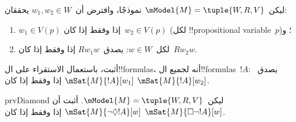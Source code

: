 \documentclass[../../../include/open-logic-section]{subfiles}
\begin{document}
\begin{prob}
  ليكن~$\mModel{M} = \tuple{W, R, V}$ نموذجًا، وافترض أن~$w_1, w_2 \in
  W$ يحققان:
  \begin{enumerate}
  \item $w_1 \in V(p)$ إذا وفقط إذا كان~$w_2 \in V(p)$ (لكل
    !!{propositional variable}~$p$)؛ و
  \item لكل~$w \in W$: يصدق~$Rw_1w$ إذا وفقط إذا كان~$Rw_2w$.
  \end{enumerate}
  أثبت، باستعمال الاستقراء على ال!!{formula}s، أنه لجميع
  ال!!{formula}s~$!A$: يصدق~$\mSat{M}{!A}[w_1]$ إذا وفقط إذا كان
  $\mSat{M}{!A}[w_2]$.
\end{prob}

\begin{probtag}{prvDiamond}
  ليكن~$\mModel{M} = \tuple{W, R, V}$. أثبت أن
  $\mSat{M}{\lnot\Diamond !A}[w]$ إذا وفقط إذا كان
  $\mSat{M}{\Box\lnot!A}[w]$.
\end{probtag}
\end{document}
